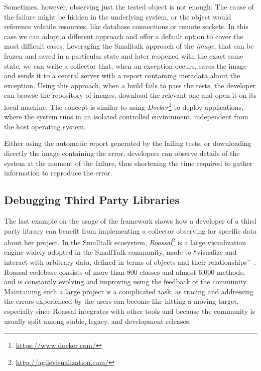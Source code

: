 Sometimes, however, observing just the tested object is not enough: The cause of the failure might be hidden in the underlying system, or the object would reference volatile resources, like database connections or remote sockets.
In this case we can adopt a different approach and offer a default option to cover the most difficult cases.
Leveraging the Smalltalk approach of the \emph{image}, that can be frozen and saved in a particular state and later reopened with the exact same state, we can write a collector that, when an exception occurs, saves the image and sends it to a central server with a report containing metadata about the exception.
Using this approach, when a build fails to pass the tests, the developer can browse the repository of images, download the relevant one and open it on its local machine.
The concept is similar to using \emph{Docker}\footnote{\url{https://www.docker.com/}} to deploy applications, where the system runs in an isolated controlled environment, independent from the host operating system.

Either using the automatic report generated by the failing tests, or downloading directly the image containing the error, developers can observe details of the system at the moment of the failure, thus shortening the time required to gather information to reproduce the error.


\subsection{Debugging Third Party Libraries}\label{sec:reified-story-libraries}

The last example on the usage of the framework shows how a developer of a third party library can benefit from implementing a collector observing for specific data about her project.
In the Smalltalk ecosystem, \emph{Roassal}\footnote{\url{http://agilevisualization.com/}} is a large visualization engine widely adopted in the SmallTalk community, made to ``visualize and interact with arbitrary data, defined in terms of objects and their relationships''~\cite{Aray2013a}.
Roassal codebase consists of more than 800 classes and almost 6,000 methods, and is constantly evolving and improving using the feedback of the community.
Maintaining such a large project is a complicated task, as tracing and addressing the errors experienced by the users can become like hitting a moving target, especially since Roassal integrates with other tools and because the community is usually split among stable, legacy, and development releases.

